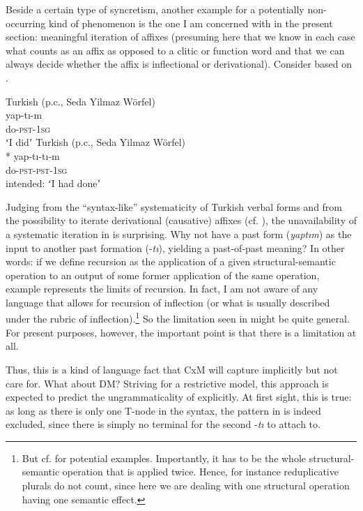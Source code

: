 \documentclass[output=paper]{langsci/langscibook}
\begin{document}
Beside a certain type of syncretism, another example for a potentially non-occurring kind of phenomenon is the one I am concerned with in the present section: meaningful iteration of affixes (presuming here that we know in each case what counts as an affix as opposed to a clitic or function word and that we can always decide whether the affix is inflectional or derivational). Consider  based on .

\ea \label{ex:reiner:25}
{Turkish (p.c., Seda Yilmaz Wörfel)}\\
\gll  yap-tı-m\\
      do-\textsc{pst}{}-1\textsc{sg}\\
\glt ʻI didʼ
\ex \label{ex:reiner:26} 
{Turkish (p.c., Seda Yilmaz Wörfel)}\\ 
\gll \textup{*} yap-tı-tı-m\\
     {} do-\textsc{pst}{}-\textsc{pst}{}-1\textsc{sg}\\
\glt intended: ʻI had doneʼ
\z

Judging from the “syntax-like” systematicity of Turkish verbal forms and from the possibility to iterate derivational (causative) affixes (cf. ), the unavailability of a systematic iteration in  is surprising. Why not have a past form (\textit{yaptım}) as the input to another past formation (-\textit{tı}), yielding a past-of-past meaning? In other words: if we define recursion as the application of a given structural-semantic operation to an output of some former application of the same operation, example  represents the limits of recursion. In fact, I am not aware of any language that allows for recursion of inflection (or what is usually described under the rubric of inflection).\footnote{But cf. \citet{Voort2016} for potential examples. Importantly, it has to be the whole structural-semantic operation that is applied twice. Hence, for instance reduplicative plurals do not count, since here we are dealing with one structural operation having one semantic effect.} So the limitation seen in  might be quite general. For present purposes, however, the important point is that there is a limitation at all.

Thus, this is a kind of language fact that CxM will capture implicitly but not care for. What about DM? Striving for a restrictive model, this approach is expected to predict the ungrammaticality of  explicitly. At first sight, this is true: as long as there is only one T-node in the syntax, the pattern in  is indeed excluded, since there is simply no terminal for the second -\textit{tı} to attach to.
\end{document}
